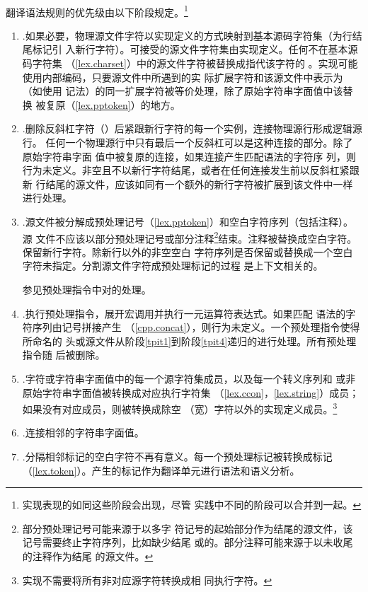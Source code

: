 \paragraph{} %
翻译语法规则的优先级由以下阶段规定。\footnote{实现表现的如同这些阶段会出现，尽管
实践中不同的阶段可以合并到一起。}

\begin{enumerate}[label={\arabic*}]
  \newcommand{\tpit}[1]{\item{\hspace{-0.5em}.#1\label{tpit\arabic{enumi}}}}
  \tpit %
    如果必要，物理源文件字符以实现定义的方式映射到基本源码字符集（为行结尾标记引
    入新行字符）。可接受的源文件字符集由实现定义。任何不在基本源码字符集
    （\ref{lex.charset}）中的源文件字符被替换成指代该字符的
    。实现可能使用内部编码，只要源文件中所遇到的实
    际扩展字符和该源文件中表示为（如使用
    记法）的同一扩展字符被等价处理，除了原始字符串字面值中该替换
    被复原（\ref{lex.pptoken}）的地方。
  \tpit %
    删除反斜杠字符（\bs）后紧跟新行字符的每一个实例，连接物理源行形成逻辑源行。
    任何一个物理源行中只有最后一个反斜杠可以是这种连接的部分。除了原始字符串字面
    值中被复原的连接，如果连接产生匹配语法的字符序
    列，则行为未定义。非空且不以新行字符结尾，或者在任何连接发生前以反斜杠紧跟新
    行结尾的源文件，应该如同有一个额外的新行字符被扩展到该文件中一样进行处理。
  \tpit %
    源文件被分解成预处理记号（\ref{lex.pptoken}）和空白字符序列（包括注释）。源
    文件不应该以部分预处理记号或部分注释\footnote{部分预处理记号可能来源于以多字
    符记号的起始部分作为结尾的源文件，该记号需要终止字符序列，比如缺少结尾
    或\tm{>}的。部分注释可能来源于以未收尾的\tm{/*}注释作为结尾
    的源文件。}结束。注释被替换成空白字符。保留新行字符。除新行以外的非空空白
    字符序列是否保留或替换成一个空白字符未指定。分割源文件字符成预处理标记的过程
    是上下文相关的。

    \begin{example}
      参见预处理指令中对\tm{<}的处理。
    \end{example}
  \tpit %
    执行预处理指令，展开宏调用并执行一元运算符表达式。如果匹配
    语法的字符序列由记号拼接产生
    （\ref{cpp.concat}），则行为未定义。一个预处理指令使得所命名的
    头或源文件从阶段\ref{tpit1}到阶段\ref{tpit4}递归的进行处理。所有预处理指令随
    后被删除。
  \tpit %
    字符或字符串字面值中的每一个源字符集成员，以及每一个转义序列和
    或非原始字符串字面值被转换成对应执行字符集
    （\ref{lex.ccon}，\ref{lex.string}）成员；如果没有对应成员，则被转换成除空
    （宽）字符以外的实现定义成员。\footnote{实现不需要将所有非对应源字符转换成相
    同执行字符。}
  \tpit %
    连接相邻的字符串字面值。
  \tpit %
    分隔相邻标记的空白字符不再有意义。每一个预处理标记被转换成标记
    （\ref{lex.token}）。产生的标记作为翻译单元进行语法和语义分析。


\end{enumerate}
